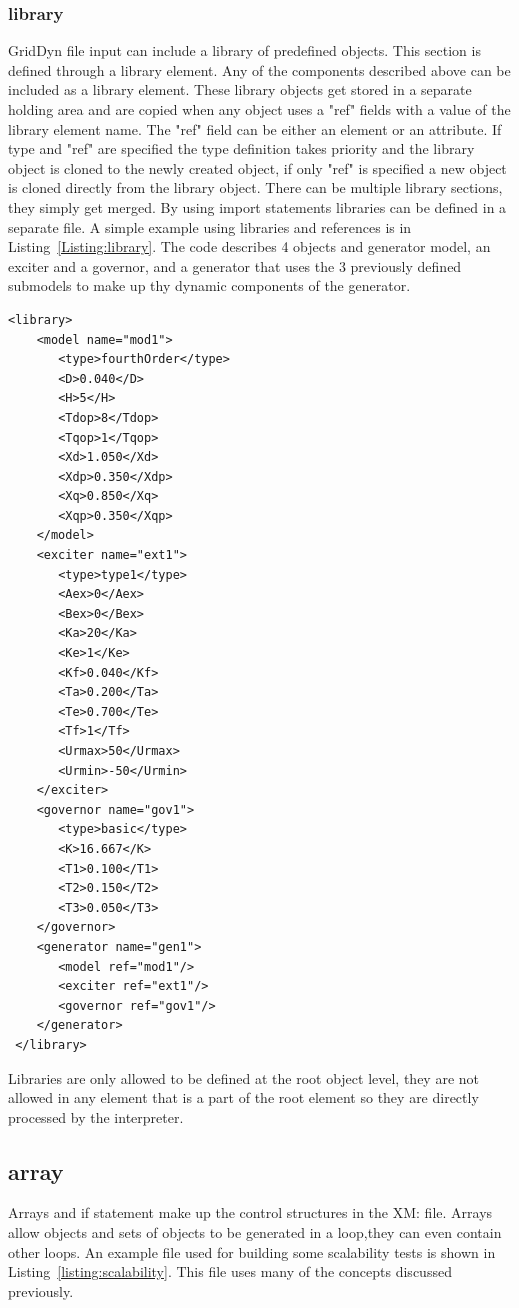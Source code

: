 \documentclass[12pt]{article} %
\begin{document}
 \subsubsection{library}
 GridDyn file input can include a library of predefined objects.  This section is defined through a library element.  Any of the components described above can be included as a library element.  These library objects get stored in a separate holding area and are copied when any object uses a "ref" fields with a value of the library element name.   The "ref" field can be either an element or an attribute.  If type and "ref" are specified the type definition takes priority and the library object is cloned to the newly created object, if only "ref" is specified a new object is cloned directly from the library object.  There can be multiple library sections, they simply get merged.  By using import statements libraries can be defined in a separate file.  A simple example using libraries and references is in Listing~\ref{Listing:library}.  The code describes 4  objects and generator model, an exciter and a governor, and a generator that uses the 3 previously defined submodels to make up thy dynamic components of the generator.  
 \begin{lstlisting}[label={Listing:library}, caption={XML code example of a library element}] 
 <library>
    <model name="mod1">
       <type>fourthOrder</type>
       <D>0.040</D>
       <H>5</H>
       <Tdop>8</Tdop>
       <Tqop>1</Tqop>
       <Xd>1.050</Xd>
       <Xdp>0.350</Xdp>
       <Xq>0.850</Xq>
       <Xqp>0.350</Xqp>
    </model>
    <exciter name="ext1">
       <type>type1</type>
       <Aex>0</Aex>
       <Bex>0</Bex>
       <Ka>20</Ka>
       <Ke>1</Ke>
       <Kf>0.040</Kf>
       <Ta>0.200</Ta>
       <Te>0.700</Te>
       <Tf>1</Tf>
       <Urmax>50</Urmax>
       <Urmin>-50</Urmin>
    </exciter>
    <governor name="gov1">
       <type>basic</type>
       <K>16.667</K>
       <T1>0.100</T1>
       <T2>0.150</T2>
       <T3>0.050</T3>
    </governor>
    <generator name="gen1">
       <model ref="mod1"/>
       <exciter ref="ext1"/>
       <governor ref="gov1"/>
    </generator>
 </library>
 \end{lstlisting}
 
 Libraries are only allowed to be defined at the root object level, they are not allowed in any element that is a part of the root element so they are directly processed by the interpreter. 
  
 \subsection{array}
 Arrays and if statement make up the control structures in the XM: file.  Arrays allow objects and sets of objects to be generated in a loop,they can even contain other loops.  An example file used for building some scalability tests is shown in Listing~\ref{listing:scalability}.  This file uses many of the concepts discussed previously.  
 
\end{document}
